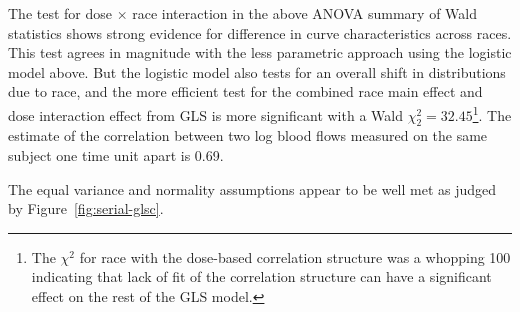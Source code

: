 The test for dose $\times$ race interaction in the above ANOVA summary \ipacue
of Wald statistics shows strong evidence for difference in curve
characteristics across races.  This test agrees in magnitude
with the less parametric approach using the logistic model above.  But
the logistic model also tests for an overall shift in distributions
due to race, and the more efficient test for the combined race main
effect and dose interaction effect from GLS is more significant
with a Wald $\chi^{2}_{2} = 32.45$\footnote{The $\chi^2$ for race with
  the dose-based correlation structure was a whopping 100 indicating
  that lack of fit of the correlation structure can have a significant
  effect on the rest of the GLS model.}. The
estimate of the correlation between two log blood flows measured on
the same subject one time unit apart is 0.69.

The equal variance and normality assumptions appear to be well met as
judged by Figure~\ref{fig:serial-glsc}.

